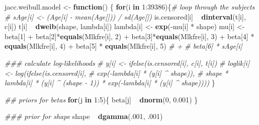 \documentclass[]{tufte-handout}
\newenvironment{Shaded}{}{}
\newcommand{\CommentTok}[1]{\textcolor[rgb]{0.38,0.63,0.69}{\textit{#1}}}
\newcommand{\ControlFlowTok}[1]{\textcolor[rgb]{0.00,0.44,0.13}{\textbf{#1}}}
\newcommand{\DecValTok}[1]{\textcolor[rgb]{0.25,0.63,0.44}{#1}}
\newcommand{\FloatTok}[1]{\textcolor[rgb]{0.25,0.63,0.44}{#1}}
\newcommand{\KeywordTok}[1]{\textcolor[rgb]{0.00,0.44,0.13}{\textbf{#1}}}
\newcommand{\NormalTok}[1]{#1}
\newcommand{\OperatorTok}[1]{\textcolor[rgb]{0.40,0.40,0.40}{#1}}
\newcommand{\StringTok}[1]{\textcolor[rgb]{0.25,0.44,0.63}{#1}}
\begin{document}
\begin{Shaded}
\begin{Highlighting}[]
\NormalTok{jacc.weibull.model <-}\StringTok{ }\ControlFlowTok{function}\NormalTok{() \{}
  \ControlFlowTok{for}\NormalTok{(i }\ControlFlowTok{in} \DecValTok{1}\OperatorTok{:}\DecValTok{39386}\NormalTok{)\{}\CommentTok{# loop through the subjects}
    \CommentTok{# sAge[i] <- (Age[i] - mean(Age[])) / sd(Age[])}
\NormalTok{    is.censored[i] }\OperatorTok{~}\StringTok{ }\KeywordTok{dinterval}\NormalTok{(t[i], c[i])}
\NormalTok{    t[i] }\OperatorTok{~}\StringTok{ }\KeywordTok{dweib}\NormalTok{(shape, lambda[i])}
\NormalTok{    lambda[i] <-}\StringTok{ }\KeywordTok{exp}\NormalTok{(}\OperatorTok{-}\NormalTok{mu[i] }\OperatorTok{*}\StringTok{ }\NormalTok{shape)}
\NormalTok{    mu[i] <-}\StringTok{ }\NormalTok{beta[}\DecValTok{1}\NormalTok{] }\OperatorTok{+}\StringTok{ }\NormalTok{beta[}\DecValTok{2}\NormalTok{]}\OperatorTok{*}\KeywordTok{equals}\NormalTok{(Mlkfre[i], }\DecValTok{2}\NormalTok{) }\OperatorTok{+}
\StringTok{      }\NormalTok{beta[}\DecValTok{3}\NormalTok{]}\OperatorTok{*}\KeywordTok{equals}\NormalTok{(Mlkfre[i], }\DecValTok{3}\NormalTok{) }\OperatorTok{+}\StringTok{ }\NormalTok{beta[}\DecValTok{4}\NormalTok{] }\OperatorTok{*}\StringTok{ }\KeywordTok{equals}\NormalTok{(Mlkfre[i], }\DecValTok{4}\NormalTok{) }\OperatorTok{+}
\StringTok{      }\NormalTok{beta[}\DecValTok{5}\NormalTok{] }\OperatorTok{*}\StringTok{ }\KeywordTok{equals}\NormalTok{(Mlkfre[i], }\DecValTok{5}\NormalTok{) }\CommentTok{# + }
      \CommentTok{# beta[6] * sAge[i]}
    
    \CommentTok{### calculate log-likelihoods}
    \CommentTok{# y[i] <- ifelse(is.censored[i], c[i], t[i])}
    \CommentTok{# loglik[i] <- log(ifelse(is.censored[i],}
    \CommentTok{#                  exp(-lambda[i] * (y[i] ^ shape)),}
    \CommentTok{#               shape * lambda[i] * (y[i] ^ (shape - 1)) * exp(-lambda[i] * (y[i] ^ shape))))}
\NormalTok{  \}}
  
  \CommentTok{## priors for betas}
  \ControlFlowTok{for}\NormalTok{(j }\ControlFlowTok{in} \DecValTok{1}\OperatorTok{:}\DecValTok{5}\NormalTok{)\{}
\NormalTok{    beta[j] }\OperatorTok{~}\StringTok{ }\KeywordTok{dnorm}\NormalTok{(}\DecValTok{0}\NormalTok{, }\FloatTok{0.001}\NormalTok{)}
\NormalTok{  \}}
  
  \CommentTok{### prior for shape}
\NormalTok{  shape }\OperatorTok{~}\StringTok{ }\KeywordTok{dgamma}\NormalTok{(.}\DecValTok{001}\NormalTok{, }\FloatTok{.001}\NormalTok{)}
  

\end{Highlighting}
\end{Shaded}
\end{document}
